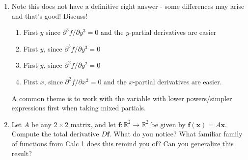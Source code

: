 \begin{enumerate}[resume]
	\item {}
	{ %
		Note this does not have a definitive right answer - some differences may arise and that's good! Discuss!
	
	\begin{enumerate}
		\item First $y$ since $\partial^3 f/\partial y^3=0$ and the $y$-partial derivatives are easier
		
		\item First $y$, since $\partial^3 f/\partial y^3=0$
		
		\item First $y$, since $\partial^2 f/\partial y^2=0$
		
		\item First $x$, since $\partial^2 f/\partial x^2=0$ and the $x$-partial derivatives are easier.
	\end{enumerate}
	
	A common theme is to work with the variable with lower powers/simpler expressions first when taking mixed partials.
	}
	{ %
	}

    \item Let $A$ be any $2\times 2$ matrix, and let $\mathbf{f}: \mathbb{R}^2\to\mathbb{R}^2$ be given by $\mathbf{f}(\mathbf{x}) = A\mathbf{x}$. Compute the total derivative $D\mathbf{f}$. What do you notice? What familiar family of functions from Calc 1 does this remind you of? Can you generalize this result? 
\end{enumerate}